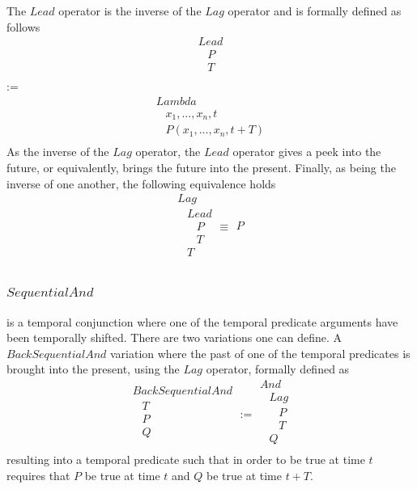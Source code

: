 \documentclass[runningheads]{llncs}
\newcommand{\SP}{\;\;\;}
\newcommand{\TLamb}{\textit{Lambda}}
\newcommand{\TAnd}{\textit{And}}
\newcommand{\TSeqAnd}{\textit{SequentialAnd}}
\newcommand{\TBSeqAnd}{\textit{BackSequentialAnd}}
\newcommand{\TLag}{\textit{Lag}}
\newcommand{\TLead}{\textit{Lead}}
\begin{document}
The $\TLead$ operator is the inverse of the $\TLag$ operator and is
formally defined as follows
$$
\begin{array}{l}
  \TLead\\
  \SP P\\
  \SP T\\
\end{array}
$$
:=
$$
\begin{array}{l}
  \TLamb\\
  \SP x_1, ..., x_n, t\\
  \SP P(x_1, ..., x_n, t+T)\\
\end{array}
$$ As the inverse of the $\TLag$ operator, the $\TLead$ operator gives
a peek into the future, or equivalently, brings the future into the
present.  Finally, as being the inverse of one another, the following
equivalence holds
$$
\begin{array}{l}
  \TLag\\
  \SP \TLead\\
  \SP \SP P\\
  \SP \SP T\\
  \SP T\\
\end{array}
\equiv
\begin{array}{l}
  P\\
\end{array}
$$

\subsubsection{$\TSeqAnd$} is a temporal conjunction where one of the
temporal predicate arguments have been temporally shifted.  There are
two variations one can define.  A $\TBSeqAnd$ variation where the past
of one of the temporal predicates is brought into the present, using the
$\TLag$ operator, formally defined as
$$
\begin{array}{l}
  \TBSeqAnd\\
  \SP T\\
  \SP P\\
  \SP Q\\
\end{array}
:=
\begin{array}{l}
  \TAnd\\
  \SP \TLag\\
  \SP \SP P\\
  \SP \SP T\\
  \SP Q\\
\end{array}
$$
resulting into a temporal predicate such that in order to be true
at time $t$ requires that $P$ be true at time $t$ and $Q$ be true at
time $t+T$.
\end{document}
